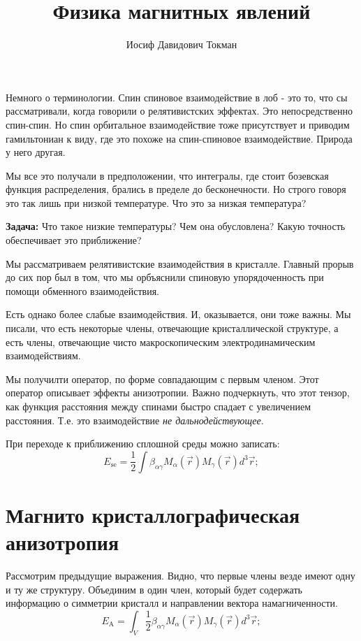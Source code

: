 \documentclass[a4paper, 14pt, russian]{article}
\title{Физика магнитных явлений}
\author{Иосиф Давидович Токман}
\date{}
\newcommand{\be}{\begin{equation}}
\newcommand{\ee}{\end{equation}}
\begin{document}
	\maketitle

	Немного о терминологии. Спин спиновое взаимодействие в лоб - это то, что
	сы рассматривали, когда говорили о релятивистских эффектах. Это непосредственно
	спин-спин. Но спин орбитальное взаимодействие тоже присутствует и приводим гамильтониан
	к виду, где это похоже на спин-спиновое взаимодействие. Природа у него другая.

	Мы все это получали в предположении, что интегралы, где стоит бозевская функция 
	распределения, брались в пределе до бесконечности. Но строго говоря это так 
	лишь при низкой температуре. Что это за низкая температура?

	\begin{tcolorbox}
		\textbf{Задача:} Что такое низкие температуры? Чем она обусловлена?
		Какую точность обеспечивает это приближение? 
	\end{tcolorbox}

	Мы рассматриваем релятивистские взаимодействия в кристалле. Главный прорыв 
	до сих пор был в том, что мы орбъяснили спиновую упорядоченность 
	при помощи обменного взаимодействия.

	Есть однако более слабые взаимодействия. И, оказывается, они тоже важны.
	Мы писали, что есть некоторые члены, отвечающие кристаллической структуре, а есть
	члены, отвечающие чисто макроскопическим электродинамическим взаимодействиям.

	Мы получилти оператор, по форме совпадающим с первым членом. Этот оператор описывает эффекты
	анизотропии. Важно подчеркнуть, что этот тензор, как функция расстояния между спинами 
	быстро спадает с увеличением расстояния. Т.е. это взаимодействие 
	\textit{не дальнодействующее}.

	При переходе к приближению сплошной среды можно записать:
	\be
		\label{eq138}
		E_\text{se} = \frac{1}{2} \int \beta_{\alpha \gamma} M_\alpha(\vec r)
			M_\gamma(\vec r) d^3 \vec r;
	\ee

	\section{Магнито кристаллографическая анизотропия}

	Рассмотрим предыдущие выражения. Видно, что первые члены везде имеют одну
	и ту же структуру. Объединим в один член, который будет содержать
	информацию о симметрии кристалл и направлении вектора намагниченности.
	\be
		\label{eq139}
		E_\text{A} = \int_V \frac{1}{2} \beta_{\alpha \gamma} 
			M_\alpha (\vec r) M_\gamma (\vec r) d^3 \vec r;
	\ee
\end{document}

